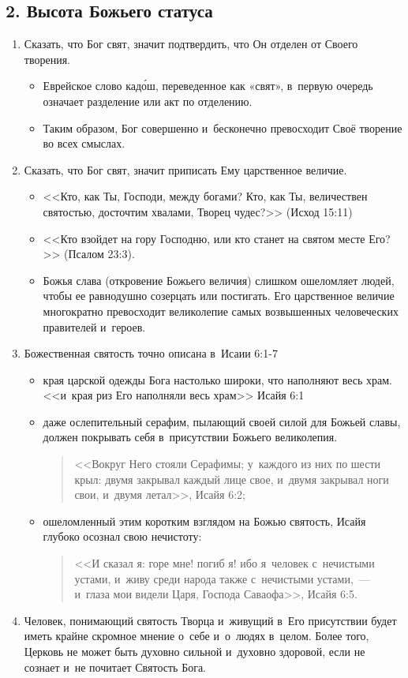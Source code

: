 \documentclass[a4paper,12pt]{article}
\begin{document}
\subsection{2. Высота Божьего статуса}        
            
\begin{enumerate}    

    \item Сказать, что Бог свят, значит подтвердить, что Он отделен от Своего творения.
    \begin{itemize}
        \item Еврейское слово кад\'{о}ш, переведенное как «свят», в~первую очередь означает разделение или акт по отделению.
        \item Таким образом, Бог совершенно и~бесконечно превосходит Своё творение во всех смыслах.
    \end{itemize}
    \item Сказать, что Бог свят, значит приписать Ему царственное величие.
    \begin{itemize}
        \item <<Кто, как Ты, Господи, между богами? Кто, как Ты, величествен святостью, досточтим хвалами, Творец чудес?>> (Исход 15:11)
        \item <<Кто взойдет на гору Господню, или кто станет на святом месте Его?>> (Псалом 23:3).
        \item Божья слава (откровение Божьего величия) слишком ошеломляет людей, чтобы ее равнодушно созерцать или постигать. Его царственное величие многократно превосходит великолепие самых возвышенных человеческих правителей и~героев.
    \end{itemize}
    \item Божественная святость точно описана в~Исаии 6:1-7
    \begin{itemize}
        \item края царской одежды Бога настолько широки, что наполняют весь храм. <<и~края риз Его наполняли весь храм>> Исайя 6:1
        \item даже ослепительный серафим, пылающий своей силой для Божьей славы, должен покрывать себя в~присутствии Божьего великолепия.
        \begin{quote}
         <<Вокруг Него стояли Серафимы; у~каждого из них по шести крыл: двумя закрывал каждый лице свое, и~двумя закрывал ноги свои, и~двумя летал>>, Исайя 6:2;
        \end{quote}
        \item ошеломленный этим коротким взглядом на Божью святость, Исайя глубоко осознал свою нечистоту:
        \begin{quote} <<И сказал я: горе мне! погиб я! ибо я~человек с~нечистыми устами, и~живу среди народа также с~нечистыми устами,~--- и~глаза мои видели Царя, Господа Саваофа>>, Исайя 6:5.
        \end{quote}
    \end{itemize}
    \item Человек, понимающий святость Творца и~живущий в~Его присутствии будет иметь крайне скромное мнение о~себе и~о~людях в~целом. Более того, Церковь не может быть духовно сильной и~духовно здоровой, если не сознает и~не почитает Святость Бога. 
    

\end{enumerate}
\end{document}
